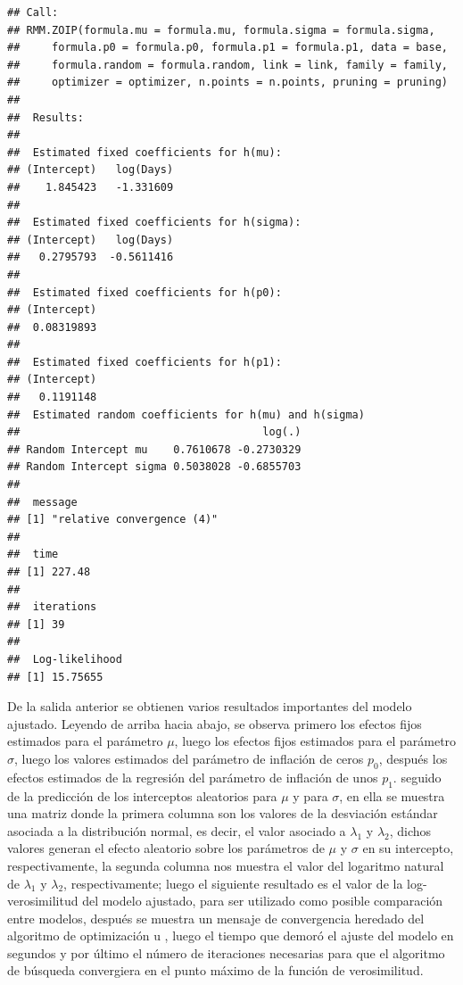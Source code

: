 \begin{verbatim}
## Call:
## RMM.ZOIP(formula.mu = formula.mu, formula.sigma = formula.sigma, 
##     formula.p0 = formula.p0, formula.p1 = formula.p1, data = base, 
##     formula.random = formula.random, link = link, family = family, 
##     optimizer = optimizer, n.points = n.points, pruning = pruning)
## 
##  Results: 
## 
##  Estimated fixed coefficients for h(mu): 
## (Intercept)   log(Days) 
##    1.845423   -1.331609 
## 
##  Estimated fixed coefficients for h(sigma): 
## (Intercept)   log(Days) 
##   0.2795793  -0.5611416 
## 
##  Estimated fixed coefficients for h(p0): 
## (Intercept) 
##  0.08319893 
## 
##  Estimated fixed coefficients for h(p1): 
## (Intercept) 
##   0.1191148 
##  Estimated random coefficients for h(mu) and h(sigma) 
##                                      log(.)
## Random Intercept mu    0.7610678 -0.2730329
## Random Intercept sigma 0.5038028 -0.6855703
## 
##  message 
## [1] "relative convergence (4)"
## 
##  time 
## [1] 227.48
## 
##  iterations 
## [1] 39
## 
##  Log-likelihood 
## [1] 15.75655
\end{verbatim}

De la salida anterior se obtienen varios resultados importantes del modelo ajustado. Leyendo de arriba hacia abajo, se observa primero los efectos fijos estimados para el par\'{a}metro $\mu$, luego los efectos fijos estimados para el par\'{a}metro $\sigma$, luego los valores estimados del par\'{a}metro de inflaci\'{o}n de ceros $p_0$, despu\'{e}s los efectos estimados de la regresi\'{o}n del par\'{a}metro de inflaci\'{o}n de unos $p_1$. seguido de la predicci\'{o}n de los interceptos aleatorios para $\mu$ y para $\sigma$, en ella se muestra una matriz donde la primera columna son los valores de la desviaci\'{o}n est\'{a}ndar asociada a la distribuci\'{o}n normal, es decir, el valor asociado a $\lambda_1$ y $\lambda_2$, dichos valores generan el efecto aleatorio sobre los par\'{a}metros de $\mu$ y $\sigma$ en su intercepto, respectivamente, la segunda columna nos muestra el valor del logaritmo natural de $\lambda_1$ y $\lambda_2$, respectivamente; luego el siguiente resultado es el valor de la log-verosimilitud del modelo ajustado, para ser utilizado como posible comparaci\'{o}n entre modelos, despu\'{e}s se muestra un mensaje de convergencia heredado del algoritmo de optimizaci\'{o}n  u , luego el tiempo que demor\'{o} el ajuste del modelo en segundos y por \'{u}ltimo el n\'{u}mero de iteraciones necesarias para que el algoritmo de b\'{u}squeda convergiera en el punto m\'{a}ximo de la funci\'{o}n de verosimilitud.\\

